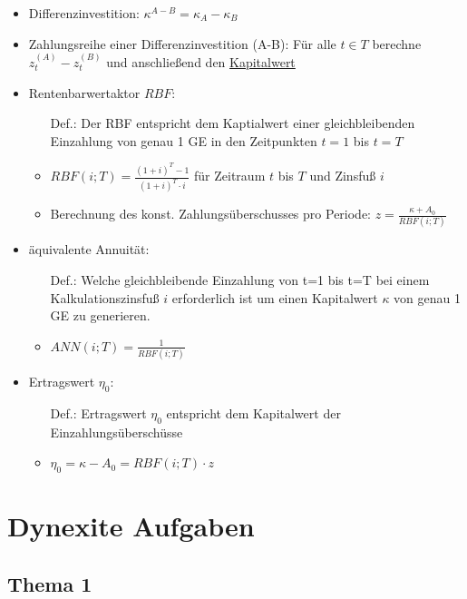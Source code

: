 \documentclass[12pt]{article}
\begin{document}
\begin{itemize}
		\item Differenzinvestition: $\kappa^{A-B}=\kappa_A - \kappa_B$
		\item Zahlungsreihe einer Differenzinvestition (A-B): Für alle $t\in T$ berechne $z_t^{(A)}-z_t^{(B)}$ und anschließend den \hyperref[Kapitalwert]{Kapitalwert} \label{ZahlungsreiheEinerDifferenzinvestition}
		\item Rentenbarwertaktor $RBF$:
			\begin{itemize}
				\item[Def.:] Der RBF entspricht dem Kaptialwert einer gleichbleibenden Einzahlung von genau 1 GE in den Zeitpunkten $t=1$ bis $t=T$
				\item $RBF(i;T)=\frac{(1+i)^T-1}{(1+i)^T\cdot i}$ für Zeitraum $t$ bis $T$ und Zinsfuß $i$ 
				\item Berechnung des konst. Zahlungsüberschusses pro Periode: $z=\frac{\kappa + A_0}{RBF(i;T)}$
			\end{itemize}
		\item äquivalente Annuität:
			\begin{itemize}
				\item[Def.:] Welche gleichbleibende Einzahlung von t=1 bis t=T bei einem Kalkulationszinsfuß $i$ erforderlich ist um einen Kapitalwert $\kappa$ von genau 1 GE zu generieren.
				\item $ANN(i;T)=\frac{1}{RBF(i;T)}$
			\end{itemize}
		\item Ertragswert $\eta_0$:
			\begin{itemize}
				\item[Def.:] Ertragswert $\eta_0$ entspricht dem Kapitalwert der Einzahlungsüberschüsse
				\item $\eta_0=\kappa-A_0 = RBF(i;T)\cdot z $
			\end{itemize}
	\end{itemize}
	\section{Dynexite Aufgaben}
	\subsection*{Thema 1}
\end{document}
